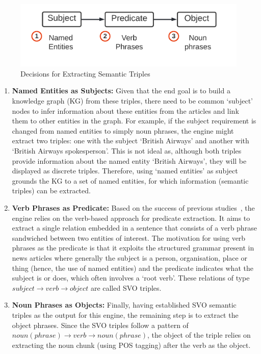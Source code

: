 \begin{figure}[H]
  \centering
  \includegraphics[scale=0.15]{images/relations_kd.png}
  \caption{Decisions for Extracting Semantic Triples}
  \vspace{-1ex}
  \label{fig:rel_key_decisions}
\end{figure}

\begin{enumerate}
  \item \textbf{Named Entities as Subjects:} Given that the end goal is to build a knowledge graph (KG) from these triples, there need to be common `subject' nodes to infer information about these entities from the articles and link them to other entities in the graph. For example, if the subject requirement is changed from named entities to simply noun phrases, the engine might extract two triples: one with the subject `British Airways' and another with `British Airways spokesperson'. This is not ideal as, although both triples provide information about the named entity `British Airways', they will be displayed as discrete triples. Therefore, using `named entities' as subject grounds the KG to a set of named entities, for which information (semantic triples) can be extracted.
  
  \item \textbf{Verb Phrases as Predicate:} Based on the success of previous studies~\cite{verb_relation_extraction}, the engine relies on the verb-based approach for predicate extraction. It aims to extract a single relation embedded in a sentence that consists of a verb phrase sandwiched between two entities of interest. The motivation for using verb phrases as the predicate is that it exploits the structured grammar present in news articles where generally the subject is a person, organisation, place or thing (hence, the use of named entities) and the predicate indicates what the subject is or does, which often involves a `root verb'. These relations of type $subject \rightarrow verb \rightarrow object$ are called SVO triples.
  
  \item \textbf{Noun Phrases as Objects:} Finally, having established SVO semantic triples as the output for this engine, the remaining step is to extract the object phrases. Since the SVO triples follow a pattern of $noun(phrase) \rightarrow verb \rightarrow noun(phrase)$, the object of the triple relies on extracting the noun chunk (using POS tagging) after the verb as the object. 
  
\end{enumerate}

